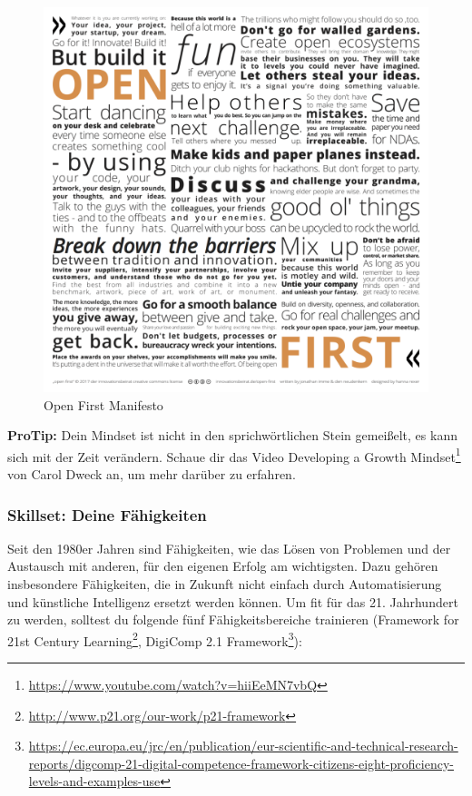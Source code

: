 \documentclass[
  ngerman,
  paper=a4,
,captions=tableheading
]{scrartcl}
\DeclareRobustCommand{\href}[2]{#2\footnote{\url{#1}}}
\begin{document}
\begin{figure}
\centering
\includegraphics{./tex2pdf.-c0ed5a8631023970/18770edc2ff369daeebec9453c72ff40587e97ed.png}
\caption{Open First Manifesto}
\end{figure}

\textbf{ProTip:} Dein Mindset ist nicht in den sprichwörtlichen Stein
gemeißelt, es kann sich mit der Zeit verändern. Schaue dir das Video
\href{https://www.youtube.com/watch?v=hiiEeMN7vbQ}{Developing a Growth
Mindset} von Carol Dweck an, um mehr darüber zu erfahren.

\hypertarget{skillset-deine-fuxe4higkeiten}{%
\subsubsection{Skillset: Deine
Fähigkeiten}\label{skillset-deine-fuxe4higkeiten}}

Seit den 1980er Jahren sind Fähigkeiten, wie das Lösen von Problemen und
der Austausch mit anderen, für den eigenen Erfolg am wichtigsten. Dazu
gehören insbesondere Fähigkeiten, die in Zukunft nicht einfach durch
Automatisierung und künstliche Intelligenz ersetzt werden können. Um fit
für das 21. Jahrhundert zu werden, solltest du folgende fünf
Fähigkeitsbereiche trainieren
(\href{http://www.p21.org/our-work/p21-framework}{Framework for 21st
Century Learning},
\href{https://ec.europa.eu/jrc/en/publication/eur-scientific-and-technical-research-reports/digcomp-21-digital-competence-framework-citizens-eight-proficiency-levels-and-examples-use}{DigiComp
2.1 Framework}):
\end{document}
